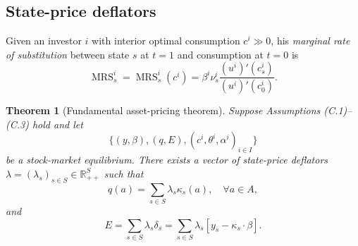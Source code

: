\documentclass[11pt,a4paper,oneside]{book}
\def\R{\mathbb{R}}
\DeclareMathOperator{\MRS}{MRS}
\theoremstyle{plain}
\newtheorem{theorem}{Theorem}[chapter]
\theoremstyle{definition}
\theoremstyle{remark}
\numberwithin{equation}{chapter}
\begin{document}
\subsection{State-price deflators}

Given an investor $i$ with interior optimal consumption $c^i \gg 0$, his \emph{marginal rate of substitution} between state $s$ at $t=1$ and consumption at $t=0$ is
\begin{equation}\label{eq:mrs-def}
  \MRS^i_s = \MRS^i_s(c^i)
  = \beta^i \nu^i_s \frac{(u^i)'(c^i_s)}{(u^i)'(c^i_0)}.
\end{equation}

\begin{theorem}[Fundamental asset-pricing theorem]\label{thm:fundamental}
Suppose Assumptions \textup{(C.1)--(C.3)} hold and let
\begin{equation*}
  \bigl\{ (y, \beta), (q, E), (c^i, \theta^i, \alpha^i)_{i \in I} \bigr\}
\end{equation*}
be a stock-market equilibrium.
There exists a vector of state-price deflators $\lambda = (\lambda_s)_{s \in S} \in \R^S_{++}$ such that
\begin{equation}\label{eq:asset-pricing}
  q(a) = \sum_{s \in S} \lambda_s \kappa_s(a),
  \quad \forall a \in A,
\end{equation}
and
\begin{equation}\label{eq:equity-pricing}
  E = \sum_{s \in S} \lambda_s \delta_s
    = \sum_{s \in S} \lambda_s [ y_s - \kappa_s \cdot \beta ].
\end{equation}
\end{theorem}
\end{document}
